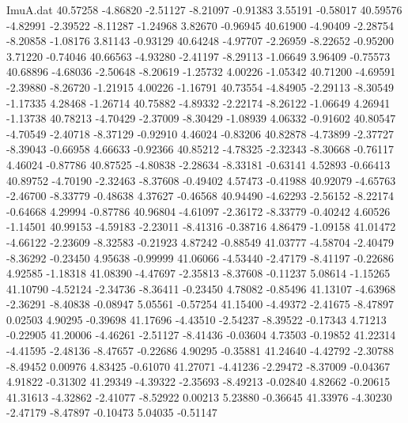 \begin{filecontents}{ImuA.dat}
  40.57258   -4.86820   -2.51127   -8.21097   -0.91383    3.55191   -0.58017
  40.59576   -4.82991   -2.39522   -8.11287   -1.24968    3.82670   -0.96945
  40.61900   -4.90409   -2.28754   -8.20858   -1.08176    3.81143   -0.93129
  40.64248   -4.97707   -2.26959   -8.22652   -0.95200    3.71220   -0.74046
  40.66563   -4.93280   -2.41197   -8.29113   -1.06649    3.96409   -0.75573
  40.68896   -4.68036   -2.50648   -8.20619   -1.25732    4.00226   -1.05342
  40.71200   -4.69591   -2.39880   -8.26720   -1.21915    4.00226   -1.16791
  40.73554   -4.84905   -2.29113   -8.30549   -1.17335    4.28468   -1.26714
  40.75882   -4.89332   -2.22174   -8.26122   -1.06649    4.26941   -1.13738
  40.78213   -4.70429   -2.37009   -8.30429   -1.08939    4.06332   -0.91602
  40.80547   -4.70549   -2.40718   -8.37129   -0.92910    4.46024   -0.83206
  40.82878   -4.73899   -2.37727   -8.39043   -0.66958    4.66633   -0.92366
  40.85212   -4.78325   -2.32343   -8.30668   -0.76117    4.46024   -0.87786
  40.87525   -4.80838   -2.28634   -8.33181   -0.63141    4.52893   -0.66413
  40.89752   -4.70190   -2.32463   -8.37608   -0.49402    4.57473   -0.41988
  40.92079   -4.65763   -2.46700   -8.33779   -0.48638    4.37627   -0.46568
  40.94490   -4.62293   -2.56152   -8.22174   -0.64668    4.29994   -0.87786
  40.96804   -4.61097   -2.36172   -8.33779   -0.40242    4.60526   -1.14501
  40.99153   -4.59183   -2.23011   -8.41316   -0.38716    4.86479   -1.09158
  41.01472   -4.66122   -2.23609   -8.32583   -0.21923    4.87242   -0.88549
  41.03777   -4.58704   -2.40479   -8.36292   -0.23450    4.95638   -0.99999
  41.06066   -4.53440   -2.47179   -8.41197   -0.22686    4.92585   -1.18318
  41.08390   -4.47697   -2.35813   -8.37608   -0.11237    5.08614   -1.15265
  41.10790   -4.52124   -2.34736   -8.36411   -0.23450    4.78082   -0.85496
  41.13107   -4.63968   -2.36291   -8.40838   -0.08947    5.05561   -0.57254
  41.15400   -4.49372   -2.41675   -8.47897    0.02503    4.90295   -0.39698
  41.17696   -4.43510   -2.54237   -8.39522   -0.17343    4.71213   -0.22905
  41.20006   -4.46261   -2.51127   -8.41436   -0.03604    4.73503   -0.19852
  41.22314   -4.41595   -2.48136   -8.47657   -0.22686    4.90295   -0.35881
  41.24640   -4.42792   -2.30788   -8.49452    0.00976    4.83425   -0.61070
  41.27071   -4.41236   -2.29472   -8.37009   -0.04367    4.91822   -0.31302
  41.29349   -4.39322   -2.35693   -8.49213   -0.02840    4.82662   -0.20615
  41.31613   -4.32862   -2.41077   -8.52922    0.00213    5.23880   -0.36645
  41.33976   -4.30230   -2.47179   -8.47897   -0.10473    5.04035   -0.51147

\end{filecontents}
